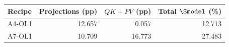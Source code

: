 \begin{tabular}{@{}lrrr@{}}
\toprule
Recipe & Projections (pp) & $QK+PV$ (pp) & Total $\Smodel$ (\%) \\
\midrule
A4-OL1 & 12.657 & 0.057 & 12.713 \\
A7-OL1 & 10.709 & 16.773 & 27.483 \\
\bottomrule
\end{tabular}
